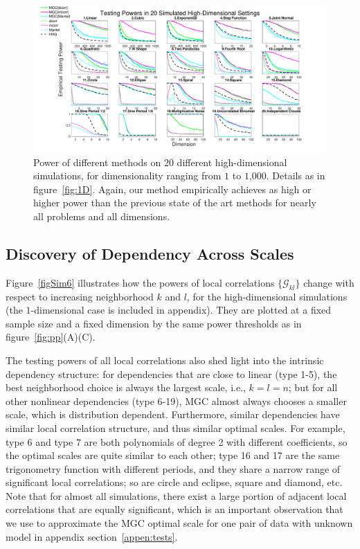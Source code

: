 \documentclass[11pt]{article}
\newcommand{\G}{\mathcal{G}}
\begin{document}
\begin{figure}[htbp]
\includegraphics[width=1.0\textwidth]{Figures/Fig5}
\caption{Power of different methods on 20 different high-dimensional simulations, for dimensionality ranging from $1$ to $1$,$000$.  Details as in figure~\ref{fig:1D}.
Again, our method empirically achieves as high or higher power than the previous state of the art methods for nearly all problems and all dimensions.
}
\label{fig:nD}
\end{figure}

\subsection{Discovery of Dependency Across Scales}
\label{main3}

Figure~\ref{figSim6} illustrates how the powers of local correlations $\{\G_{kl}\}$ change with respect to increasing neighborhood $k$ and $l$, for the high-dimensional simulations (the $1$-dimensional case is included in appendix). They are plotted at a fixed sample size and a fixed dimension by the same power thresholds as in figure~\ref{fig:pp}(A)(C). 

The testing powers of all local correlations also shed light into the intrinsic dependency structure: for dependencies that are close to linear (type 1-5), the best neighborhood choice is always the largest scale, i.e., $k=l=n$; but for all other nonlinear dependencies (type 6-19), MGC almost always chooses a smaller scale, which is distribution dependent. Furthermore, similar dependencies have similar local correlation structure, and thus similar optimal scales. For example, type 6 and type 7 are both polynomials of degree 2 with different coefficients, so the optimal scales are quite similar to each other; type 16 and 17 are the same trigonometry function with different periods, and they share a narrow range of significant local correlations; so are circle and eclipse, square and diamond, etc. Note that for almost all simulations, there exist a large portion of adjacent local correlations that are equally significant, which is an important observation that we use to approximate the MGC optimal scale for one pair of data with unknown model in appendix section~\ref{appen:tests}.
\end{document}
